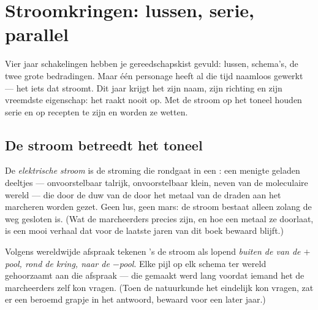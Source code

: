 \chapter{Stroomkringen: lussen, serie, parallel}\label{ch:g7:circuits-series-parallel}

Vier jaar schakelingen hebben je gereedschapskist gevuld: lussen,
schema's, de twee grote bedradingen. Maar één personage heeft al die
tijd naamloos gewerkt --- het iets dat stroomt. Dit jaar krijgt het
zijn naam, zijn richting en zijn vreemdste eigenschap: het raakt nooit
op. Met de stroom op het toneel houden serie en  op recepten
te zijn en worden ze wetten.

\section{De stroom betreedt het toneel}

\begin{definition}\label{def:g7:circuits-series-parallel:current}
De \emph{elektrische stroom} is de stroming
die rondgaat in een : een menigte geladen
deeltjes --- onvoorstelbaar talrijk, onvoorstelbaar klein, neven van
de moleculaire wereld --- die door de duw van de  door het
metaal van de draden aan het marcheren worden gezet. Geen lus, geen
mars: de stroom bestaat alleen zolang de weg gesloten is. (Wat de
marcheerders precies zijn, en hoe een metaal ze doorlaat, is een mooi
verhaal dat voor de laatste jaren van dit boek bewaard blijft.)
\end{definition}

\begin{proposition}\label{prop:g7:circuits-series-parallel:direction}
Volgens wereldwijde afspraak tekenen 's de stroom als
lopend \emph{buiten de  van de $+$pool, rond de kring,
naar de $-$pool}. Elke pijl op elk schema ter wereld gehoorzaamt
aan die afspraak --- die gemaakt werd lang voordat iemand het de
marcheerders zelf kon vragen. (Toen de natuurkunde het eindelijk kon
vragen, zat er een beroemd grapje in het antwoord, bewaard voor een
later jaar.)
\end{proposition}

